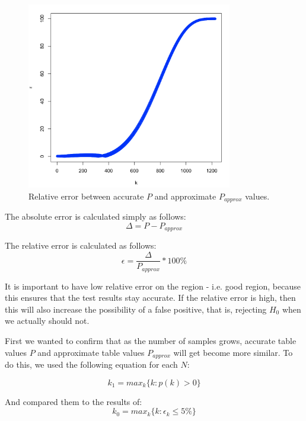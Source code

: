 \documentclass[12pt]{article}
\begin{document}
\begin{figure}[H]
  \centering
  \includegraphics[width=0.8\textwidth]{approximate_accurate_epsilon}
  \caption{Relative error between accurate $P$ and approximate $P_{approx}$ values.}
  \label{fig:epsilon_difference}
\end{figure}

The absolute error is calculated simply as follows:
\begin{equation}
  \Delta = P - P_{approx}
\end{equation}

The relative error is calculated as follows:
\begin{equation}
  \epsilon = \frac{\Delta}{P_{approx}} * 100\%
\end{equation}

It is important to have low relative error on the region - i.e. good region, because this ensures that the test results stay accurate. If the relative error is high, then this will also increase the possibility of a false positive, that is, rejecting $H_0$ when we actually should not.

First we wanted to confirm that as the number of samples grows, accurate table values $P$ and approximate table values $P_{approx}$ will get become more similar. To do this, we used the following equation for each $N$:

\begin{equation}
  k_1 = max_k \{ k: p(k) > 0 \}
\end{equation}

And compared them to the results of:
\begin{equation}
  k_0 = max_k \{ k: \epsilon_k \leq 5\% \}
\end{equation}
\end{document}

